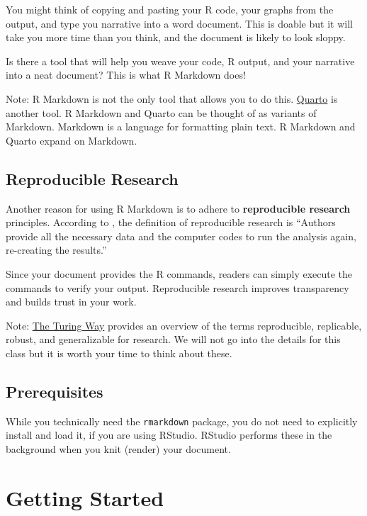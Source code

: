 \documentclass[
]{book}
\theoremstyle{definition}
\theoremstyle{definition}
\theoremstyle{definition}
\theoremstyle{definition}
\theoremstyle{remark}
\begin{document}
You might think of copying and pasting your R code, your graphs from the output, and type you narrative into a word document. This is doable but it will take you more time than you think, and the document is likely to look sloppy.

Is there a tool that will help you weave your code, R output, and your narrative into a neat document? This is what R Markdown does!

Note: R Markdown is not the only tool that allows you to do this. \href{https://quarto.org/}{Quarto} is another tool. R Markdown and Quarto can be thought of as variants of Markdown. Markdown is a language for formatting plain text. R Markdown and Quarto expand on Markdown.

\hypertarget{reproduce}{%
\subsection{Reproducible Research}\label{reproduce}}

Another reason for using R Markdown is to adhere to \textbf{reproducible research} principles. According to \citet{rep}, the definition of reproducible research is ``Authors provide all the necessary data and the computer codes to run the analysis again, re-creating the results.''

Since your document provides the R commands, readers can simply execute the commands to verify your output. Reproducible research improves transparency and builds trust in your work.

Note: \href{https://quarto.org/}{The Turing Way} provides an overview of the terms reproducible, replicable, robust, and generalizable for research. We will not go into the details for this class but it is worth your time to think about these.

\hypertarget{prerequisites}{%
\subsection{Prerequisites}\label{prerequisites}}

While you technically need the \texttt{rmarkdown} package, you do not need to explicitly install and load it, if you are using RStudio. RStudio performs these in the background when you knit (render) your document.

\hypertarget{getting-started}{%
\section{Getting Started}\label{getting-started}}
\end{document}
